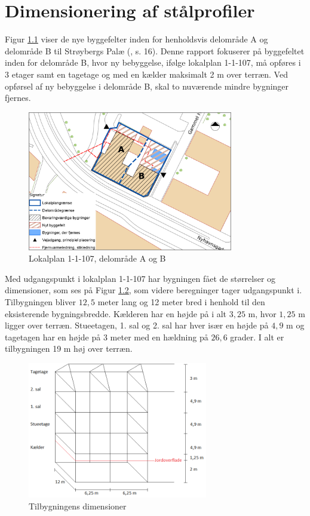 \chapter{Dimensionering af stålprofiler}

Figur \ref{fig:hej} viser de nye byggefelter inden for henholdsvis delområde A og delområde B til Strøybergs Palæ (\citep{lokalplan}, s. 16). Denne rapport fokuserer på byggefeltet inden for delområde B, hvor ny bebyggelse, ifølge lokalplan 1-1-107, må opføres i 3 etager samt en tagetage og med en kælder maksimalt 2 m over terræn. Ved opførsel af ny bebyggelse i delområde B, skal to nuværende mindre bygninger fjernes. 

\begin{figure}[htbp]
	\centering
	\includegraphics[width=0.8\textwidth]{billeder/signatur.png}
	\caption{Lokalplan 1-1-107, delområde A og B \citep[ bilag 2, s. 35]{lokalplan}}
	\label{fig:hej}
\end{figure}

Med udgangspunkt i lokalplan 1-1-107 har bygningen fået de størrelser og dimensioner, som ses på Figur \ref{fig:farvel}, som videre beregninger tager udgangspunkt i.
\newline \indent{     }  Tilbygningen bliver $12,\!5$ meter lang og 12 meter bred i henhold til den eksisterende bygningsbredde. Kælderen har en højde på i alt $3,\!25$ m, hvor $1,\!25$ m ligger over terræn. Stueetagen, 1. sal og 2. sal har hver især en højde på $4,\!9$ m og tagetagen har en højde på 3 meter med en hældning på $26,\!6$ grader. I alt er tilbygningen 19 m høj over terræn.

\begin{figure}[htbp]
	\centering
	\includegraphics[width=0.7\textwidth]{billeder/tilbygning2.png}
	\caption{Tilbygningens dimensioner}
	\label{fig:farvel}
\end{figure}

